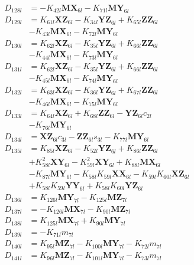 \begin{multicols}{2}
\begin{align}
D_{128l} &= - K_{42l}\mathbf{MX}_{6l} - K_{71l}\mathbf{MY}_{6l} \nonumber \\
D_{129l} &= K_{61l}\mathbf{XZ}_{6l} - K_{34l}\mathbf{YZ}_{6l} + K_{65l}\mathbf{ZZ}_{6l}  \nonumber \\
&- K_{43l}\mathbf{MX}_{6l} - K_{72l}\mathbf{MY}_{6l} \nonumber \\
D_{130l} &= K_{62l}\mathbf{XZ}_{6l} - K_{35l}\mathbf{YZ}_{6l} + K_{66l}\mathbf{ZZ}_{6l}  \nonumber \\
&- K_{44l}\mathbf{MX}_{6l} - K_{73l}\mathbf{MY}_{6l} \nonumber \\
D_{131l} &= K_{62l}\mathbf{XZ}_{6l} - K_{35l}\mathbf{YZ}_{6l} + K_{66l}\mathbf{ZZ}_{6l}  \nonumber \\
&- K_{45l}\mathbf{MX}_{6l} - K_{74l}\mathbf{MY}_{6l} \nonumber \\
D_{132l} &= K_{63l}\mathbf{XZ}_{6l} - K_{36l}\mathbf{YZ}_{6l} + K_{67l}\mathbf{ZZ}_{6l}  \nonumber \\
&- K_{46l}\mathbf{MX}_{6l} - K_{75l}\mathbf{MY}_{6l} \nonumber \\
D_{133l} &= K_{64l}\mathbf{XZ}_{6l} + K_{68l}\mathbf{ZZ}_{6l} - \mathbf{YZ}_{6l}c_{2l}  \nonumber \\
&- K_{76l}\mathbf{MY}_{6l} \nonumber \\
D_{134l} &= \mathbf{XZ}_{6l}c_{3l} - \mathbf{ZZ}_{6l}s_{3l} - K_{77l}\mathbf{MY}_{6l} \nonumber \\
D_{135l} &= K_{85l}\mathbf{XZ}_{6l} - K_{52l}\mathbf{YZ}_{6l} + K_{86l}\mathbf{ZZ}_{6l}  \nonumber \\
&+ K_{58l}^2\mathbf{XY}_{6l} - K_{59l}^2\mathbf{XY}_{6l} + K_{88l}\mathbf{MX}_{6l}  \nonumber \\
&- K_{87l}\mathbf{MY}_{6l} - K_{58l}K_{59l}\mathbf{XX}_{6l} - K_{59l}K_{60l}\mathbf{XZ}_{6l}  \nonumber \\
&+ K_{58l}K_{59l}\mathbf{YY}_{6l} + K_{58l}K_{60l}\mathbf{YZ}_{6l} \nonumber \\
D_{136l} &= K_{126l}\mathbf{MY}_{7l} - K_{125l}\mathbf{MZ}_{7l} \nonumber \\
D_{137l} &= - K_{126l}\mathbf{MX}_{7l} - K_{90l}\mathbf{MZ}_{7l} \nonumber \\
D_{138l} &= K_{125l}\mathbf{MX}_{7l} + K_{90l}\mathbf{MY}_{7l} \nonumber \\
D_{139l} &= -K_{71l}m_{7l} \nonumber \\
D_{140l} &= K_{95l}\mathbf{MZ}_{7l} - K_{100l}\mathbf{MY}_{7l} - K_{72l}m_{7l} \nonumber \\
D_{141l} &= K_{96l}\mathbf{MZ}_{7l} - K_{101l}\mathbf{MY}_{7l} - K_{73l}m_{7l} \nonumber \\

\end{align}
\end{multicols}
